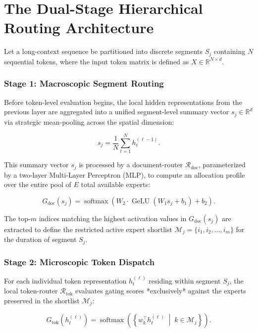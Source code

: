 \chapter{The Dual-Stage Hierarchical Routing Architecture}

Let a long-context sequence be partitioned into discrete segments $S_j$ containing $N$ sequential tokens, where the input token matrix is defined as $X \in \mathbb{R}^{N \times d}$. 

\subsection{Stage 1: Macroscopic Segment Routing}
Before token-level evaluation begins, the local hidden representations from the previous layer are aggregated into a unified segment-level summary vector $s_j \in \mathbb{R}^{d}$ via strategic mean-pooling across the spatial dimension:

\begin{equation}
s_j = \frac{1}{N}\sum_{t=1}^{N} h_t^{(\ell-1)}.
\end{equation}

This summary vector $s_j$ is processed by a document-router $\mathcal{R}_{\text{doc}}$, parameterized by a two-layer Multi-Layer Perceptron (MLP), to compute an allocation profile over the entire pool of $E$ total available experts:

\begin{equation}
G_{\text{doc}}(s_j) = \operatorname{softmax}\left(W_2 \cdot \operatorname{GeLU}\left(W_1 s_j + b_1\right) + b_2\right).
\end{equation}

The top-$m$ indices matching the highest activation values in $G_{\text{doc}}(s_j)$ are extracted to define the restricted active expert shortlist $\mathcal{M}_j = \{i_1, i_2, \dots, i_m\}$ for the duration of segment $S_j$.

\subsection{Stage 2: Microscopic Token Dispatch}
For each individual token representation $h_t^{(\ell)}$ residing within segment $S_j$, the local token-router $\mathcal{R}_{\text{tok}}$ evaluates gating scores *exclusively* against the experts preserved in the shortlist $\mathcal{M}_j$:

\begin{equation}
G_{\text{tok}}\left(h_t^{(\ell)}\right) = \operatorname{softmax}\left( \left\{ w_k^{\top} h_t^{(\ell)} \;\middle|\; k \in \mathcal{M}_j \right\} \right).
\end{equation}

